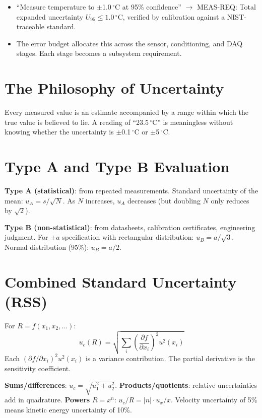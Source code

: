 \documentclass[11pt,letterpaper,twoside,openany]{book}
\newcommand{\degC}{\ensuremath{{}^{\circ}\text{C}}}
\begin{document}
\begin{keyconceptbox}
\begin{itemize}[nosep,leftmargin=1.5em]
\item ``Measure temperature to $\pm$1.0\,\degC{} at 95\% confidence'' $\to$ MEAS-REQ: Total expanded uncertainty $U_{95} \leq 1.0$\,\degC{}, verified by calibration against a NIST-traceable standard.
\item The error budget allocates this across the sensor, conditioning, and DAQ stages. Each stage becomes a subsystem requirement.
\end{itemize}
\end{keyconceptbox}


\section{The Philosophy of Uncertainty}
Every measured value is an estimate accompanied by a range within which the true value is believed to lie. A reading of ``23.5\,\degC{}'' is meaningless without knowing whether the uncertainty is $\pm$0.1\,\degC{} or $\pm$5\,\degC{}.

\section{Type A and Type B Evaluation}
\textbf{Type A (statistical)}: from repeated measurements. Standard uncertainty of the mean: $u_A = s/\sqrt{N}$. As $N$ increases, $u_A$ decreases (but doubling $N$ only reduces by $\sqrt{2}$).

\textbf{Type B (non-statistical)}: from datasheets, calibration certificates, engineering judgment. For $\pm a$ specification with rectangular distribution: $u_B = a/\sqrt{3}$. Normal distribution (95\%): $u_B = a/2$.

\section{Combined Standard Uncertainty (RSS)}
For $R = f(x_1, x_2, \ldots)$:
\begin{equation}
u_c(R) = \sqrt{\sum_{i}\left(\frac{\partial f}{\partial x_i}\right)^2 u^2(x_i)}
\end{equation}
Each $(\partial f/\partial x_i)^2 u^2(x_i)$ is a variance contribution. The partial derivative is the sensitivity coefficient.

\textbf{Sums/differences}: $u_c = \sqrt{u_1^2 + u_2^2}$. \textbf{Products/quotients}: relative uncertainties add in quadrature. \textbf{Powers} $R = x^n$: $u_c/R = |n| \cdot u_x/x$. Velocity uncertainty of 5\% means kinetic energy uncertainty of 10\%.
\end{document}
